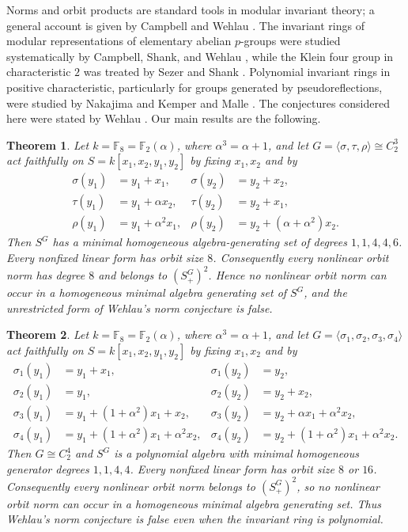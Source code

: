 \documentclass[11pt]{article}
\newtheorem{theorem}{Theorem}[section]
\theoremstyle{definition}
\begin{document}
	Norms and orbit products are standard tools in modular invariant theory; a general account is given by Campbell and Wehlau \cite{CW}. The invariant rings of modular representations of elementary abelian $p$-groups were studied systematically by Campbell, Shank, and Wehlau \cite{CSW}, while the Klein four group in characteristic $2$ was treated by Sezer and Shank \cite{SS}. Polynomial invariant rings in positive characteristic, particularly for groups generated by pseudoreflections, were studied by Nakajima \cite{Nak} and Kemper and Malle \cite{KM}. The conjectures considered here were stated by Wehlau \cite{OP,WC}. Our main results are the following.

	\begin{theorem}
		\label{thm:norm-unrestricted}
		Let $k=\mathbb F_8=\mathbb F_2(\alpha)$, where
		$\alpha^3=\alpha+1$, and let
		$G=\langle\sigma,\tau,\rho\rangle\cong C_2^3$ act faithfully on $S=k[x_1,x_2,y_1,y_2]$ by fixing $x_1,x_2$ and by
		\[
		\begin{aligned}
			\sigma(y_1)&=y_1+x_1,
			&\sigma(y_2)&=y_2+x_2,\\
			\tau(y_1)&=y_1+\alpha x_2,
			&\tau(y_2)&=y_2+x_1,\\
			\rho(y_1)&=y_1+\alpha^2x_1,
			&\rho(y_2)&=y_2+(\alpha+\alpha^2)x_2.
		\end{aligned}
		\]
		Then $S^G$ has a minimal homogeneous algebra-generating set of degrees $1,1,4,4,6$. Every nonfixed linear form has orbit size $8$.  Consequently every nonlinear orbit norm has degree $8$ and belongs to $(S^G_+)^2$. Hence no nonlinear orbit norm can occur in a homogeneous minimal algebra generating set of $S^G$, and the unrestricted form of Wehlau's norm conjecture is false.
	\end{theorem}
	
	\begin{theorem}
		\label{thm:norm-polynomial}
		Let $k=\mathbb F_8=\mathbb F_2(\alpha)$, where
		$\alpha^3=\alpha+1$, and let
		$G=\langle\sigma_1,\sigma_2,\sigma_3,\sigma_4\rangle$ act faithfully on $S=k[x_1,x_2,y_1,y_2]$ by fixing $x_1,x_2$ and by
		\[
		\begin{aligned}
			\sigma_1(y_1)&=y_1+x_1,
			&\sigma_1(y_2)&=y_2,\\
			\sigma_2(y_1)&=y_1,
			&\sigma_2(y_2)&=y_2+x_2,\\
			\sigma_3(y_1)&=y_1+(1+\alpha^2)x_1+x_2,
			&\sigma_3(y_2)&=y_2+\alpha x_1+\alpha^2x_2,\\
			\sigma_4(y_1)&=y_1+(1+\alpha^2)x_1+\alpha^2x_2,
			&\sigma_4(y_2)&=y_2+(1+\alpha^2)x_1+\alpha^2x_2.
		\end{aligned}
		\]
		Then $G\cong C_2^4$ and $S^G$ is a polynomial algebra with minimal homogeneous generator degrees $1,1,4,4$. Every nonfixed linear form has orbit size $8$ or $16$.  Consequently
		every nonlinear orbit norm belongs to $(S^G_+)^2$, so no nonlinear orbit norm can occur in a homogeneous minimal algebra generating set.  Thus Wehlau's norm conjecture is false even when the invariant ring is polynomial.
	\end{theorem}
\end{document}
